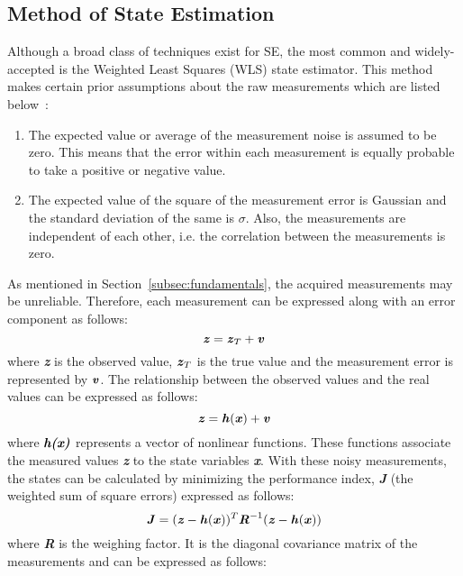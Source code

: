 \documentclass[thesis.tex]{subfiles}
\begin{document}
\subsection{Method of State Estimation}
Although a broad class of techniques exist for SE, the most common and widely-accepted is the Weighted Least Squares (WLS) state estimator. This method makes certain prior assumptions about the raw measurements which are listed below~\cite{Wollenberg}:
\begin{enumerate}
	\item The expected value or average of the measurement noise is assumed to be zero. This means that the error within each measurement is equally probable to take a positive or negative value.
	\item The expected value of the square of the measurement error is Gaussian and the standard deviation of the same is \textbf{\textit{$\sigma$}}. Also, the measurements are independent of each other, i.e. the correlation between the measurements is zero. 
\end{enumerate}
As mentioned in Section~\ref{subsec:fundamentals}, the acquired measurements may be unreliable. Therefore, each measurement can be expressed along with an error component as follows:
\begin{equation}
\textbf{\textit{z}} = \textbf{\textit{z}}_{T} + \textbf{\textit{v}}
\end{equation}
where \textbf{\textit{z}} is the observed value, $\textbf{\textit{z}}_{T}$ is the true value and the measurement error is represented by $\textbf{\textit{v}}$. The relationship between the observed values and the real values can be expressed as follows:
\begin{equation}
\textbf{\textit{z}} = \textbf{\textit{h}}(\textbf{\textit{x}}) + \textbf{\textit{v}}
\end{equation}
where $\textbf{\textit{h(x)}}$ represents a vector of nonlinear functions. These functions associate the measured values \textbf{\textit{z}} to the state variables \textbf{\textit{x}}. 
With these noisy measurements, the states can be calculated by minimizing the performance index, \textbf{\textit{J}} (the weighted sum of square errors) expressed as follows:
\begin{equation}
\textbf{\textit{J}} = (\textbf{\textit{z}}-\textbf{\textit{h}}(\textbf{\textit{x}}))^{T}\textbf{\textit{R}}^{-1}(\textbf{\textit{z}}-\textbf{\textit{h}}(\textbf{\textit{x}}))
\end{equation}
where \textbf{\textit{R}} is the weighing factor. It is the diagonal covariance matrix of the measurements and can be expressed as follows:
\end{document}
